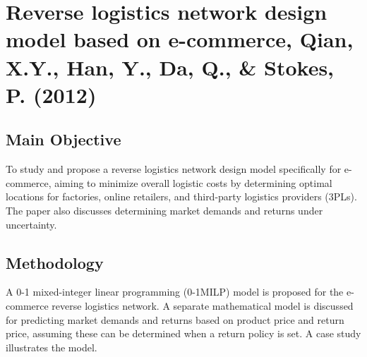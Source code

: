 \section{{Reverse logistics network design model based on e-commerce, Qian, X.Y., Han, Y., Da, Q., \& Stokes, P. (2012)}}

\subsection*{Main Objective}
To study and propose a reverse logistics network design model specifically for e-commerce, aiming to minimize overall logistic costs by determining optimal locations for factories, online retailers, and third-party logistics providers (3PLs). The paper also discusses determining market demands and returns under uncertainty.

\subsection*{Methodology}
A 0-1 mixed-integer linear programming (0-1MILP) model is proposed for the e-commerce reverse logistics network. A separate mathematical model is discussed for predicting market demands and returns based on product price and return price, assuming these can be determined when a return policy is set. A case study illustrates the model.

